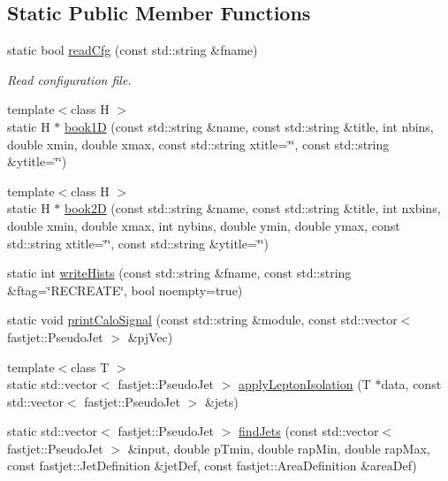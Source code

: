 \subsection*{Static Public Member Functions}
\begin{DoxyCompactItemize}
\item 
static bool \hyperlink{structAnalysisHelper_aa57f0b93d44ecf911f696233d1261536}{read\+Cfg} (const std\+::string \&fname)
\begin{DoxyCompactList}\small\item\em Read configuration file. \end{DoxyCompactList}\item 
{\footnotesize template$<$class H $>$ }\\static H $\ast$ \hyperlink{structAnalysisHelper_a48c5bba742f7eebaffd6d925031ddeeb}{book1D} (const std\+::string \&name, const std\+::string \&title, int nbins, double xmin, double xmax, const std\+::string xtitle=\char`\"{}\char`\"{}, const std\+::string \&ytitle=\char`\"{}\char`\"{})
\item 
{\footnotesize template$<$class H $>$ }\\static H $\ast$ \hyperlink{structAnalysisHelper_a868cc395e90f06fa8a63a2f5fbbef4c6}{book2D} (const std\+::string \&name, const std\+::string \&title, int nxbins, double xmin, double xmax, int nybins, double ymin, double ymax, const std\+::string xtitle=\char`\"{}\char`\"{}, const std\+::string \&ytitle=\char`\"{}\char`\"{})
\item 
static int \hyperlink{structAnalysisHelper_a8d8a117fe4692b12e538cf9f7b922e3a}{write\+Hists} (const std\+::string \&fname, const std\+::string \&ftag=\char`\"{}R\+E\+C\+R\+E\+A\+TE\char`\"{}, bool noempty=true)
\item 
static void \hyperlink{structAnalysisHelper_af9edc04923cd574a2b32773657355b3e}{print\+Calo\+Signal} (const std\+::string \&module, const std\+::vector$<$ fastjet\+::\+Pseudo\+Jet $>$ \&pj\+Vec)
\item 
{\footnotesize template$<$class T $>$ }\\static std\+::vector$<$ fastjet\+::\+Pseudo\+Jet $>$ \hyperlink{structAnalysisHelper_ab4bb8ee731c60efc2ac291c9de4e6c01}{apply\+Lepton\+Isolation} (T $\ast$data, const std\+::vector$<$ fastjet\+::\+Pseudo\+Jet $>$ \&jets)
\item 
static std\+::vector$<$ fastjet\+::\+Pseudo\+Jet $>$ \hyperlink{structAnalysisHelper_aa5434096d3f526cdd97288f61935dea4}{find\+Jets} (const std\+::vector$<$ fastjet\+::\+Pseudo\+Jet $>$ \&input, double p\+Tmin, double rap\+Min, double rap\+Max, const fastjet\+::\+Jet\+Definition \&jet\+Def, const fastjet\+::\+Area\+Definition \&area\+Def)

\end{DoxyCompactItemize}
